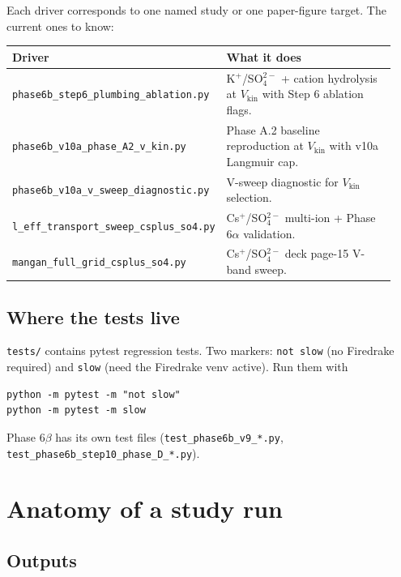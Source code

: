 \documentclass[11pt]{article}
\begin{document}
Each driver corresponds to one named study or one paper-figure
target. The current ones to know:

\begin{center}
\begin{tabular}{p{0.42\linewidth} p{0.52\linewidth}}
\toprule
\textbf{Driver} & \textbf{What it does} \\
\midrule
\texttt{phase6b\_step6\_plumbing\_ablation.py}
  & K$^+$/SO$_4^{2-}$ + cation hydrolysis at $V_{\mathrm{kin}}$ with
    Step 6 ablation flags. \\
\texttt{phase6b\_v10a\_phase\_A2\_v\_kin.py}
  & Phase A.2 baseline reproduction at $V_{\mathrm{kin}}$ with v10a
    Langmuir cap. \\
\texttt{phase6b\_v10a\_v\_sweep\_diagnostic.py}
  & V-sweep diagnostic for $V_{\mathrm{kin}}$ selection. \\
\texttt{l\_eff\_transport\_sweep\_csplus\_so4.py}
  & Cs$^+$/SO$_4^{2-}$ multi-ion + Phase 6$\alpha$ validation. \\
\texttt{mangan\_full\_grid\_csplus\_so4.py}
  & Cs$^+$/SO$_4^{2-}$ deck page-15 V-band sweep. \\
\bottomrule
\end{tabular}
\end{center}

\subsection{Where the tests live}

\texttt{tests/} contains pytest regression tests. Two markers:
\texttt{not slow} (no Firedrake required) and \texttt{slow} (need
the Firedrake venv active). Run them with
\begin{lstlisting}
python -m pytest -m "not slow"
python -m pytest -m slow
\end{lstlisting}
Phase 6$\beta$ has its own test files
(\texttt{test\_phase6b\_v9\_*.py},
\texttt{test\_phase6b\_step10\_phase\_D\_*.py}).

\section{Anatomy of a study run}

\subsection{Outputs}
\end{document}
